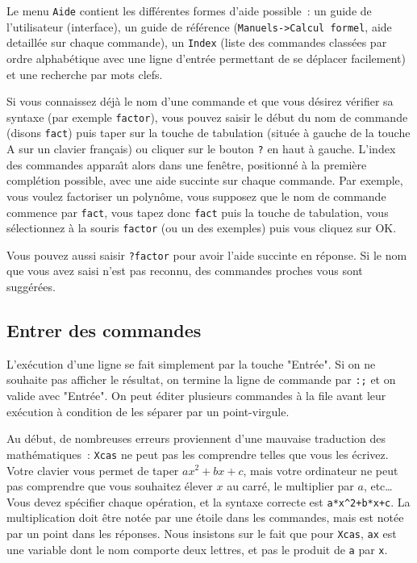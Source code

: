 \documentclass{article}
\begin{document}
Le menu \verb|Aide| contient les diff\'erentes formes d'aide possible~:
un guide de l'utilisateur (interface), un guide de r\'ef\'erence
(\verb|Manuels->Calcul formel|, aide detaill\'ee sur chaque commande), 
un \verb|Index| (liste des commandes class\'ees par ordre 
alphab\'etique avec une ligne d'entr\'ee permettant de se d\'eplacer
facilement) et une recherche par mots clefs.

Si vous connaissez d\'ej\`a le nom d'une commande et que vous d\'esirez
v\'erifier sa syntaxe (par exemple \verb|factor|), vous pouvez
saisir le d\'ebut du nom de commande 
(disons \verb|fact|) puis taper sur la touche de tabulation
(situ\'ee \`a gauche de la touche A sur un clavier
fran\c{c}ais) ou cliquer sur le bouton \verb|?| en haut \`a gauche. 
L'index des commandes appara\^\i t alors dans une fen\^etre, positionn\'e 
\`a la premi\`ere compl\'etion possible, avec une aide succinte sur chaque
commande. 
Par exemple, vous voulez factoriser un polyn\^ome, vous supposez que le nom de
commande commence par \verb|fact|, vous tapez donc \verb|fact| puis
la touche de tabulation, vous s\'electionnez \`a la souris
\verb|factor| (ou un des exemples) puis vous cliquez sur OK.

Vous pouvez aussi saisir \verb|?factor| pour avoir l'aide succinte
en r\'eponse. Si le nom que vous avez saisi n'est pas reconnu, des
commandes proches vous sont sugg\'er\'ees.

%
\subsection{Entrer des commandes}
%
L'ex\'ecution d'une ligne se fait simplement par la touche "Entr\'ee". 
Si on ne souhaite pas afficher le r\'esultat, on termine la ligne de commande
par \verb|:;| et on valide avec "Entr\'ee".
On peut \'editer plusieurs commandes \`a la file avant leur ex\'ecution
\`a condition de les s\'eparer par un point-virgule.

Au d\'ebut, de nombreuses erreurs proviennent d'une
mauvaise traduction des math\'ematiques~: {\tt Xcas} ne peut pas les comprendre
telles que vous les \'ecrivez. Votre clavier vous
permet de taper $ax^2+bx+c$, mais votre ordinateur ne peut pas
comprendre que vous souhaitez \'elever $x$ au carr\'e, le multiplier
par $a$, etc\ldots~ Vous devez sp\'ecifier chaque op\'eration, et la
syntaxe correcte est \verb|a*x^2+b*x+c|.  
La multiplication doit \^etre not\'ee par une \'etoile 
dans les commandes, mais est not\'ee par un point dans
les r\'eponses. Nous insistons sur le fait que pour {\tt Xcas}, \verb|ax| est 
une variable dont le nom comporte deux lettres, et pas le produit de \verb|a|
par \verb|x|.
\end{document}
